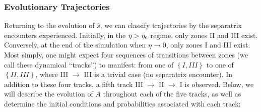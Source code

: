 \documentclass[
        fleqn,
        usenatbib,
        referee,
    ]{mnras}
\newcommand*{\z}[1]{\left\{#1\right\}}
\begin{document}
\subsubsection{Evolutionary Trajectories}\label{sss:evol_traj}

Returning to the evolution of $\hat{s}$, we can classify trajectories by the
separatrix encounters experienced. Initially, in the $\eta > \eta_{\rm c}$ regime,
only zones II and III exist. Conversely, at the end of the simulation when $\eta
\to 0$, only zones I and III exist. Most simply, one might expect four sequences
of transitions between zones (we call these dynamical ``tracks'') to manifest:
from one of $\z{I, III}$ to one of $\z{II, III}$, where III $\to$ III is a
trivial case (no separatrix encounter). In addition to these four tracks, a
fifth track III $\to$ II $\to$ I is observed. Below, we will describe the
evolution of $A$ throughout each of the five tracks, as well as determine the
initial conditions and probabilities associated with each track:
\end{document}
